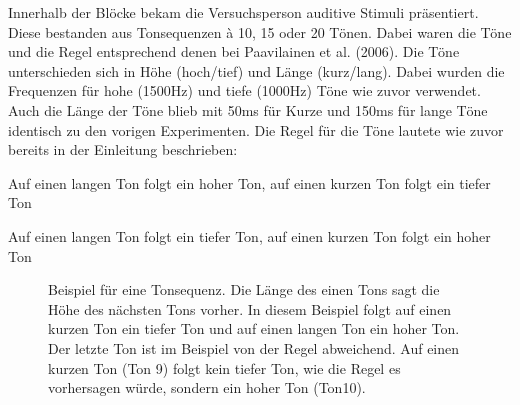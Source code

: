 \documentclass[doc,a4paper,12pt]{apa6}
\begin{document}
Innerhalb der Blöcke bekam die Versuchsperson auditive Stimuli präsentiert. Diese bestanden aus Tonsequenzen à 10, 15 oder 20 Tönen. Dabei waren die Töne und die Regel entsprechend denen bei Paavilainen et al. (2006). Die Töne unterschieden sich in Höhe (hoch/tief) und Länge (kurz/lang). Dabei wurden die Frequenzen für hohe (1500Hz) und tiefe (1000Hz) Töne wie zuvor verwendet. Auch die Länge der Töne blieb mit 50ms für Kurze und 150ms für lange Töne identisch zu den vorigen Experimenten. Die Regel für die Töne lautete wie zuvor bereits in der Einleitung beschrieben:

\begin{compactitem}
  \item Auf einen langen Ton folgt ein hoher Ton, auf einen kurzen Ton folgt ein tiefer
Ton
  \item Auf einen langen Ton folgt ein tiefer Ton, auf einen kurzen Ton folgt ein hoher
Ton
\end{compactitem}

\newpage

\begin{figure}
  \centering
  \begin{minipage}{\textwidth}
    \setlength{\fboxsep}{.05\textwidth}
    \vspace{10pt}
    \caption{Beispiel für eine Tonsequenz. Die Länge des einen Tons sagt die Höhe des nächsten Tons vorher. In diesem Beispiel folgt auf einen kurzen Ton ein tiefer Ton und auf einen langen Ton ein hoher Ton. Der letzte Ton ist im Beispiel von der Regel abweichend. Auf einen kurzen Ton (Ton 9) folgt kein tiefer Ton, wie die Regel es vorhersagen würde, sondern ein hoher Ton (Ton10).}
  \end{minipage}
  \vspace{-5pt}
\end{figure}
\end{document}
